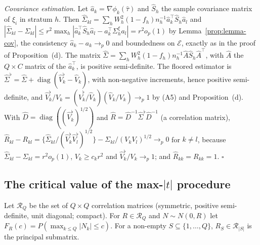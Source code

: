 \emph{Covariance estimation.} Let $\hat a_k=\nabla\phi_k(\hat\tau)$ and $\hat S_h$ the sample covariance matrix of $\xi_i$ in stratum $h$. Then $\hat\Sigma_{kl}=\sum_hW_h^2(1-f_h)n_h^{-1}\hat a_k^\top\hat S_h\hat a_l$ and $|\hat\Sigma_{kl}-\Sigma_{kl}|\le r^2\max_h|\hat a_k^\top\hat S_h\hat a_l-a_k^\top\Sigma^\xi_ha_l|=r^2o_p(1)$ by Lemma~\ref{prop:lemma-cov}, the consistency $\hat a_k-a_k\to_p0$ and boundedness on $\mathcal E$, exactly as in the proof of Proposition~(d). The matrix $\hat\Sigma=\sum_hW_h^2(1-f_h)n_h^{-1}\hat A\hat S_h\hat A^\top$, with $\hat A$ the $Q\times C$ matrix of the $\hat a_k^\top$, is positive semi-definite. The floored estimator is $\hat\Sigma^\flat=\hat\Sigma+\operatorname{diag}(\hat V^\flat_k-\hat V_k)$, with non-negative increments, hence positive semi-definite, and $\hat V^\flat_k/V_k=(\hat V_k^\flat/\hat V_k)(\hat V_k/V_k)\to_p1$ by (A5) and Proposition~(d). With $\hat D=\operatorname{diag}((\hat V^\flat_k)^{1/2})$ and $\hat R=\hat D^{-1}\hat\Sigma^\flat\hat D^{-1}$ (a correlation matrix),
$\hat R_{kl}-R_{kl}=\{\hat\Sigma_{kl}/(\hat V_k^\flat\hat V_l^\flat)^{1/2}\}-\Sigma_{kl}/(V_kV_l)^{1/2}\to_p0$ for $k\ne l$, because $\hat\Sigma_{kl}-\Sigma_{kl}=r^2o_p(1)$, $V_k\ge c_kr^2$ and $\hat V^\flat_k/V_k\to_p1$; and $\hat R_{kk}=R_{kk}=1$. $\square$

\subsection{The critical value of the max-\texorpdfstring{$|t|$}{t} procedure}\label{si:testing-crit}

Let $\mathcal R_Q$ be the set of $Q\times Q$ correlation matrices (symmetric, positive semi-definite, unit diagonal; compact). For $R\in\mathcal R_Q$ and $N\sim N(0,R)$ let $F_R(c)=P(\max_{k\le Q}|N_k|\le c)$. For a non-empty $S\subseteq\{1,\dots,Q\}$, $R_S\in\mathcal R_{|S|}$ is the principal submatrix.

